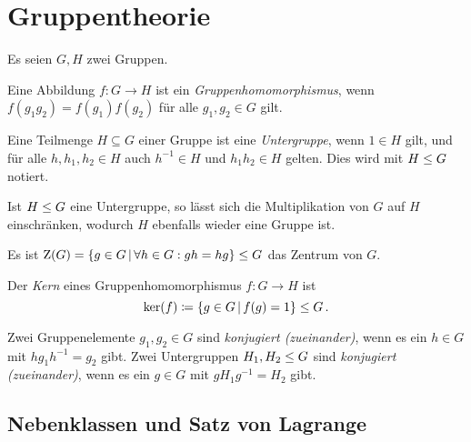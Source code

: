 \chapter{Gruppentheorie}

Es seien $G, H$ zwei Gruppen.

\begin{definition}
  Eine Abbildung $f \colon G \to H$ ist ein \emph{Gruppenhomomorphismus}, wenn $f(g_1 g_2) = f(g_1) f(g_2)$ für alle $g_1, g_2 \in G$ gilt.
\end{definition}

\begin{definition}
  Eine Teilmenge $H \subseteq G$ einer Gruppe ist eine \emph{Untergruppe}, wenn $1 \in H$ gilt, und für alle $h, h_1, h_2 \in H$ auch $h^{-1} \in H$ und $h_1 h_2 \in H$ gelten.
  Dies wird mit $H \mathrel{\leq} G$ notiert.
\end{definition}

Ist $H \mathrel{\leq} G$ eine Untergruppe, so lässt sich die Multiplikation von $G$ auf $H$ einschränken, wodurch $H$ ebenfalls wieder eine Gruppe ist.

\begin{example}
  Es ist $\groupcenter{G} = \{g \in G \suchthat \forall h \in G: gh = hg\} \subgroup G$ das Zentrum von $G$.
\end{example}

\begin{definition}
  Der \emph{Kern} eines Gruppenhomomorphismus $f \colon G \to H$ ist
  \[
              \ker(f)
    \defined  \{
                g \in G
              \suchthat
                f(g) = 1
              \}
    \subgroup G \,.
  \]
\end{definition}

\begin{definition}
  Zwei Gruppenelemente $g_1, g_2 \in G$ sind \emph{konjugiert \textup(zueinander\textup)}, wenn es ein $h \in G$ mit $h g_1 h^{-1} = g_2$ gibt.
  Zwei Untergruppen $H_1, H_2 \mathrel{\leq} G$ sind \emph{konjugiert \textup(zueinander\textup)}, wenn es ein $g \in G$ mit $g H_1 g^{-1} = H_2$ gibt.
\end{definition}








\section{Nebenklassen und Satz von Lagrange}

